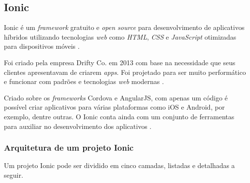 \subsection{Ionic} \label{subsection:ionic}
Ionic é um \textit{framework} gratuito e \textit{open source} para desenvolvimento de aplicativos híbridos utilizando tecnologias 
\textit{web} como \textit{HTML}, \textit{CSS} e \textit{JavaScript} otimizadas para dispositivos móveis \cite{drifty_ionic:_2016}. 

Foi criado pela empresa Drifty Co. em 2013 com base na necessidade que seus clientes apresentavam de criarem \textit{apps}. 
Foi projetado para ser muito performático e funcionar com padrões e tecnologias \textit{web} modernas \cite{drifty_about_2016}.

Criado sobre os \textit{frameworks} Cordova e AngularJS, com apenas um código é possível criar aplicativos para várias 
plataformas como iOS e Android, por exemplo, dentre outras. O Ionic conta ainda com um conjunto de ferramentas para auxiliar 
no desenvolvimento dos aplicativos \cite{drifty_ionic:_2016}.

\subsubsection{Arquitetura de um projeto Ionic} \label{subsubsection:arc-ionic}

Um projeto Ionic pode ser dividido em cinco camadas, listadas e detalhadas a seguir.

